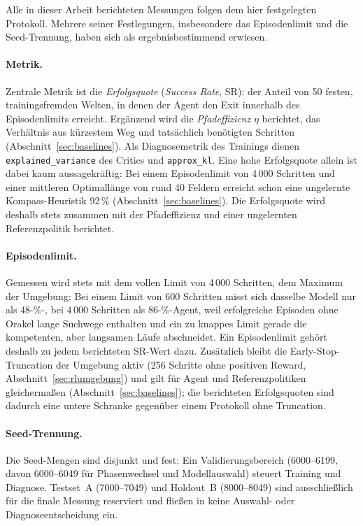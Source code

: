 \documentclass[11pt,a4paper]{article}
\begin{document}
Alle in dieser Arbeit berichteten Messungen folgen dem hier festgelegten
Protokoll. Mehrere seiner Festlegungen, insbesondere das Episodenlimit und
die Seed-Trennung, haben sich als ergebnisbestimmend erwiesen.

\paragraph{Metrik.}
Zentrale Metrik ist die \emph{Erfolgsquote} (\emph{Success Rate}, SR): der
Anteil von 50 festen, trainingsfremden Welten, in denen der Agent den Exit
innerhalb des Episodenlimits erreicht. Ergänzend wird die \emph{Pfadeffizienz}
$\eta$ berichtet, das Verhältnis aus kürzestem Weg und tatsächlich benötigten
Schritten (Abschnitt~\ref{sec:baselines}). Als Diagnosemetrik des Trainings
dienen \texttt{explained\_variance} des Critics und \texttt{approx\_kl}. Eine
hohe Erfolgsquote allein ist dabei kaum aussagekräftig: Bei einem
Episodenlimit von 4\,000 Schritten und einer mittleren Optimallänge von rund
40 Feldern erreicht schon eine ungelernte Kompass-Heuristik 92\,\%
(Abschnitt~\ref{sec:baselines}). Die Erfolgsquote wird deshalb stets
zusammen mit der Pfadeffizienz und einer ungelernten Referenzpolitik
berichtet.

\paragraph{Episodenlimit.}
\label{sec:evalfallstricke}
Gemessen wird stets mit dem vollen Limit von 4\,000 Schritten, dem Maximum
der Umgebung: Bei einem Limit von 600 Schritten misst sich dasselbe Modell
nur als 48-\%-, bei 4\,000 Schritten als 86-\%-Agent, weil erfolgreiche
Episoden ohne Orakel lange Suchwege enthalten und ein zu knappes Limit
gerade die kompetenten, aber langsamen Läufe abschneidet. Ein Episodenlimit
gehört deshalb zu jedem berichteten SR-Wert dazu. Zusätzlich bleibt die
Early-Stop-Truncation der Umgebung aktiv (256 Schritte ohne positiven Reward,
Abschnitt~\ref{sec:rlumgebung}) und gilt für Agent und Referenzpolitiken
gleichermaßen (Abschnitt~\ref{sec:baselines}); die berichteten Erfolgsquoten
sind dadurch eine untere Schranke gegenüber einem Protokoll ohne Truncation.

\paragraph{Seed-Trennung.}
Die Seed-Mengen sind disjunkt und fest: Ein Validierungsbereich
(6000--6199, davon 6000--6049 für Phasenwechsel und Modellauswahl) steuert
Training und Diagnose. Testset~A (7000--7049) und Holdout~B (8000--8049)
sind ausschließlich für die finale Messung reserviert und fließen in keine
Auswahl- oder Diagnoseentscheidung ein.
\end{document}
